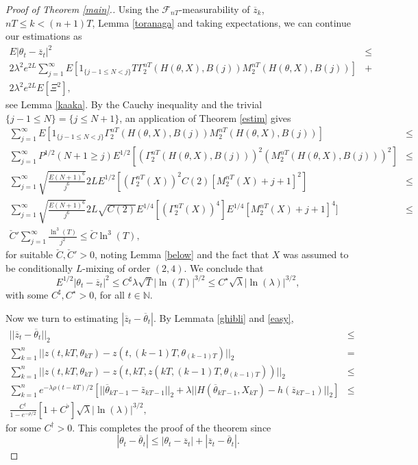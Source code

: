 \documentclass[a4paper,draft]{article}
\begin{document}
\begin{proof}[Proof of Theorem \ref{main}.]
Using the $\mathcal{F}_{nT}$-measurability of $\overline{z}_k$,
$nT\leq k<(n+1)T$, Lemma \ref{toranaga} and taking expectations, we can continue our estimations as
\begin{eqnarray*}
E| \theta_{t}-\overline{z}_{t}|^2 &\leq&\\
2\lambda^2 e^{2L}\sum_{j=1}^{\infty}E[1_{\{j-1\leq N <j\}}
T\Gamma_2^{nT}(H(\theta,X),B(j))M_2^{nT}(H(\theta,X),B(j))] &+&\\
2\lambda^2 e^{2L} 
E\left[\Xi^2\right],
\end{eqnarray*}
see Lemma \ref{kaaka}.
By the Cauchy inequality and the trivial $\{j-1\leq N\}=\{j\leq N+1\}$,
an application of Theorem \ref{estim} gives
\begin{eqnarray*}
\sum_{j=1}^{\infty}E[1_{\{j-1\leq N <j\}}
\Gamma_2^{nT}(H(\theta,X),B(j))M_2^{nT}(H(\theta,X),B(j))] &\leq&\\
\sum_{j=1}^{\infty} P^{1/2}(N+1\geq j)
E^{1/2}[(\Gamma_2^{nT}(H(\theta,X),B(j)))^2(M_2^{nT}(H(\theta,X),B(j)))^2] &\leq&\\
\sum_{j=1}^{\infty}\sqrt{\frac{E(N+1)^6}{j^6}}2LE^{1/2}[(\Gamma^{nT}_2(X))^2 C(2)[M_2^{nT}(X)+j+1]^2] &\leq&\\
\sum_{j=1}^{\infty}\sqrt{\frac{E(N+1)^6}{j^6}}2L\sqrt{C(2)}
E^{1/4}[(\Gamma^{nT}_2(X))^4]
E^{1/4}[M_2^{nT}(X)+j+1]^4] &\leq&\\
\check{C}'\sum_{j=1}^{\infty} \frac{\ln^3(T)}{j^2}
\leq \check{C}\ln^3(T), & &
\end{eqnarray*}
for suitable $\check{C}, \check{C}'>0$, noting Lemma \ref{below}
and the fact that $X$ was assumed
to be conditionally $L$-mixing of order $(2,4)$. We conclude that
$$
E^{1/2}| \theta_{t}-\overline{z}_{t}|^2\leq C^{\sharp}\lambda \sqrt{T}
|\ln(T)|^{3/2}\leq C^{\star}\sqrt{\lambda}|\ln(\lambda)|^{3/2},
$$
with some $C^{\sharp},C^{\star}>0$, for all $t\in\mathbb{N}$. 

Now we turn to
estimating $|\overline{z}_t-\overline{\theta}_t|$. By Lemmata \ref{ghibli}
and \ref{easy},
\begin{eqnarray*}
||\overline{z}_t-\overline{\theta}_t||_2 &\leq &\\
\sum_{k=1}^n ||z(t,kT,\theta_{kT}) - z(t, (k-1)T, \theta_{(k-1)T})||_2 &=& \\
\sum_{k=1}^n ||z(t,kT,\theta_{kT}) - z(t, kT, z(kT,(k-1)T, \theta_{(k-1)T}))||_2 
&\leq &\\ 
\sum_{k = 1}^{n} e^{-\lambda\rho(t-kT)/2} 
\left[||\overline{\theta}_{kT -1} - \bar{z}_{kT-1}||_2 + 
\lambda ||H(\overline{\theta}_{kT-1},X_{kT}) - h(\overline{z}_{kT-1})||_2\right]
&\leq &\\
\frac{C^{\dagger}}{1-e^{-\rho/2}}\left[1+C^{\flat}\right]\sqrt{\lambda}
|\ln(\lambda)|^{3/2},
\end{eqnarray*}
for some $C^{\dagger}>0$.
This completes the proof of the theorem since 
$$
|\theta_t-\overline{\theta}_t|\leq |{\theta}_t-\overline{z}_t|+
|\overline{z}_t-\overline{\theta}_t|.
$$
\end{proof}
\end{document}
